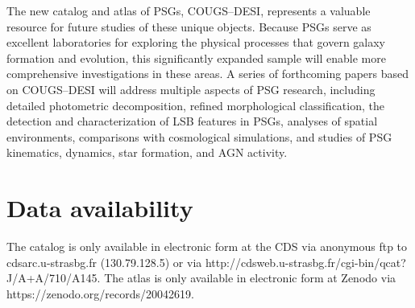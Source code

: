\documentclass{aa}
\begin{document}
The new catalog and atlas of PSGs, COUGS–DESI, represents a valuable resource for future studies of these unique objects. Because PSGs serve as excellent laboratories for exploring the physical processes that govern galaxy formation and evolution, this significantly expanded sample will enable more comprehensive investigations in these areas. A series of forthcoming papers based on COUGS–DESI will address multiple aspects of PSG research, including detailed photometric decomposition, refined morphological classification, the detection and characterization of LSB features in PSGs, analyses of spatial environments, comparisons with cosmological simulations, and studies of PSG kinematics, dynamics, star formation, and AGN activity.

\section*{Data availability}
The catalog is only available in electronic form at the CDS via anonymous ftp to cdsarc.u-strasbg.fr (130.79.128.5) or via http://cdsweb.u-strasbg.fr/cgi-bin/qcat?J/A+A/710/A145. The atlas is only available in electronic form at Zenodo via https://zenodo.org/records/20042619.
\end{document}
